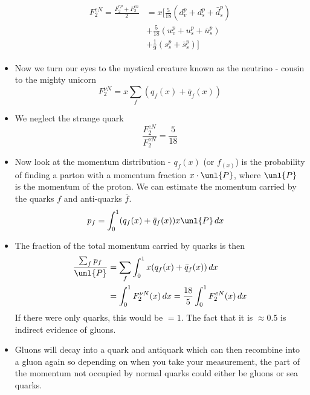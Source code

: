 \documentclass[a4paper, 11pt, normalem]{report}
\begin{document}
\begin{itemize}
\begin{align}
            \begin{split}
                F_2^{eN} = \frac{F_2^{ep} + F_2^{en}}{2} &= x\bigg[\frac{5}{18}\left(d_v^p + d_s^p + \bar{d}_s^p\right) \\ &+ \frac{5}{18}\left(u_v^p + u_s^p + \bar{u}_s^p\right) \\ &+ \frac19\left(s_s^p + \bar{s}_s^p\right)\bigg]
            \end{split}
        \end{align}
    \item Now we turn our eyes to the mystical creature known as the neutrino - cousin to the mighty unicorn
        \begin{equation}
            F_2^{\nu N} = x\sum_f (q_f(x) + \bar{q}_f(x))
        \end{equation}
    \item We neglect the strange quark
        \begin{equation}
            \frac{F_2^{eN}}{F_2^{\nu N}} = \frac{5}{18}
        \end{equation}
    \item Now look at the momentum distribution - $q_f(x)$ (or $f_(x)$) is the probability of finding a parton with a momentum fraction $x\cdot\unl{P}$, where $\unl{P}$ is the momentum of the proton. 
        We can estimate the momentum carried by the quarks $f$ and anti-quarks $\bar{f}$.
        \begin{align}
            p_f &= \int_0^1 (q_f(x) + \bar{q}_f(x))x\unl{P}\,dx
        \end{align}
    \item The fraction of the total momentum carried by quarks is then
        \begin{align}
            \frac{\sum_f p_f}{\unl{P}} &= \sum_f \int_0^1 x(q_f(x) + \bar{q}_f(x))\,dx \\
                                       &= \int_0^1 F_2^{\nu N}(x)\,dx = \frac{18}{5}\int_0^1 F_2^{eN}(x)\,dx
        \end{align}
        If there were only quarks, this would be $= 1$. 
        The fact that it is $\approx 0.5$ is indirect evidence of gluons. 
    \item Gluons will decay into a quark and antiquark which can then recombine into a gluon again so depending on when you take your measurement, the part of the momentum not occupied by normal quarks could either be gluons or sea quarks.
\end{itemize}
\end{document}
